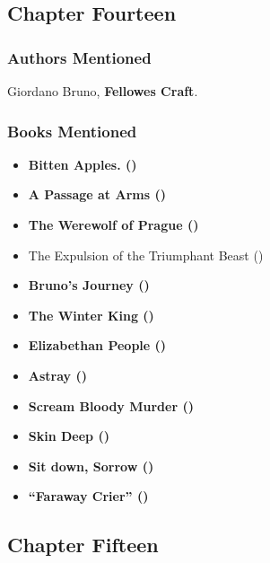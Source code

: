 \documentclass[
]{article}
\providecommand{\tightlist}{%
  \setlength{\itemsep}{0pt}\setlength{\parskip}{0pt}}
\begin{document}
\subsection{Chapter Fourteen}\label{chapter-fourteen}

\subsubsection{Authors Mentioned}\label{authors-mentioned-5}

Giordano Bruno, \textbf{Fellowes Craft}.

\subsubsection{Books Mentioned}\label{books-mentioned-6}

\begin{itemize}
\tightlist
\item
  \textbf{Bitten Apples. ()}
\item
  \textbf{A Passage at Arms ()}
\item
  \textbf{The Werewolf of Prague ()}
\item
  The Expulsion of the Triumphant Beast ()
\item
  \textbf{Bruno's Journey ()}
\item
  \textbf{The Winter King ()}
\item
  \textbf{Elizabethan People ()}
\item
  \textbf{Astray ()}
\item
  \textbf{Scream Bloody Murder ()}
\item
  \textbf{Skin Deep ()}
\item
  \textbf{Sit down, Sorrow ()}
\item
  \textbf{{``Faraway Crier''} ()}
\end{itemize}

\subsection{Chapter Fifteen}\label{chapter-fifteen}
\end{document}
